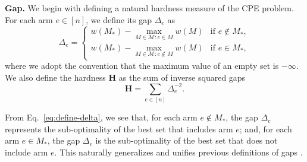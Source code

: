 \documentclass{article}
\newcommand{\Problem}{{CPE}\xspace}
\newcommand{\M}{\mathcal M}
\newcommand{\MultiIdent}{\textsc{TopK}\xspace}
\newcommand{\MultiBandit}{\textsc{MB}\xspace}
\begin{document}
\textbf{Gap.} We begin with defining a natural hardness measure of the \Problem problem. 
For each arm $e \in [n]$, we define its gap $\Delta_e$ as
\begin{equation}
\label{eq:define-delta}
\Delta_e = \begin{cases}
			   w(M_*)-\max_{M\in \M: e\in M} w(M) & \text{if } e\not \in M_*, \\
			   w(M_*)-\max_{M\in \M: e\not \in M} w(M) & \text{if } e\in M_*,
			\end{cases}
\end{equation}
where we adopt the convention that the maximum value of an empty set is $-\infty$. 
We also define the hardness $\mathbf H$ as the sum of inverse squared gaps 
\begin{equation}
\label{eq:hardness}
\mathbf H =\sum_{e\in [n]} \Delta_e^{-2}.
\end{equation}

From Eq.~\eqref{eq:define-delta}, we see that, for each arm $e\not\in M_*$, the gap $\Delta_e$ represents the sub-optimality of the best set that includes arm $e$; and, for each arm $e\in M_*$, the gap $\Delta_e$ is the sub-optimality of the best set that does not include arm $e$.
This naturally generalizes and unifies previous definitions of gaps \citep{audibert2010best,NIPS2011_4478,kalyanakrishnan2010efficient,bubeck2013multiple}.
\end{document}
